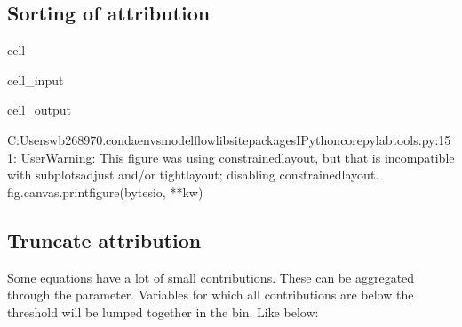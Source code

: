 \documentclass[letterpaper,10pt,english]{jupyterBook}
\begin{document}
\subsection{Sorting of attribution}
\label{\detokenize{content/06_ModelAnalytics/Attribution:sorting-of-attribution}}
\begin{sphinxuseclass}{cell}\begin{sphinxVerbatimInput}

\begin{sphinxuseclass}{cell_input}
\begin{sphinxVerbatim}[commandchars=\\\{\}]
\end{sphinxVerbatim}

\end{sphinxuseclass}\end{sphinxVerbatimInput}
\begin{sphinxVerbatimOutput}

\begin{sphinxuseclass}{cell_output}
\begin{sphinxVerbatim}[commandchars=\\\{\}]
C:\PYGZbs{}Users\PYGZbs{}wb268970\PYGZbs{}.conda\PYGZbs{}envs\PYGZbs{}modelflow\PYGZbs{}lib\PYGZbs{}site\PYGZhy{}packages\PYGZbs{}IPython\PYGZbs{}core\PYGZbs{}pylabtools.py:151: UserWarning: This figure was using constrained\PYGZus{}layout, but that is incompatible with subplots\PYGZus{}adjust and/or tight\PYGZus{}layout; disabling constrained\PYGZus{}layout.
  fig.canvas.print\PYGZus{}figure(bytes\PYGZus{}io, **kw)
\end{sphinxVerbatim}

\noindent{}

\end{sphinxuseclass}\end{sphinxVerbatimOutput}

\end{sphinxuseclass}

\subsection{Truncate attribution}
\label{\detokenize{content/06_ModelAnalytics/Attribution:truncate-attribution}}
\sphinxAtStartPar
Some equations have a lot of small contributions. These can be aggregated through the  parameter.
Variables for which all contributions are below the threshold will be lumped together in the  bin. Like below:
\end{document}
